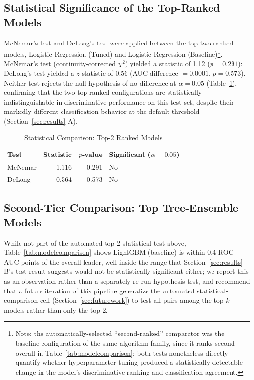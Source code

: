 \documentclass[journal]{IEEEtran}
\begin{document}
\subsection{Statistical Significance of the Top-Ranked Models}

McNemar's test and DeLong's test were applied between the top two ranked models, Logistic Regression (Tuned) and Logistic Regression (Baseline)\footnote{Note: the automatically-selected ``second-ranked'' comparator was the baseline configuration of the same algorithm family, since it ranks second overall in Table~\ref{tab:modelcomparison}; both tests nonetheless directly quantify whether hyperparameter tuning produced a statistically detectable change in the model's discriminative ranking and classification agreement.}. McNemar's test (continuity-corrected $\chi^2$) yielded a statistic of 1.12 ($p=0.291$); DeLong's test yielded a $z$-statistic of 0.56 (AUC difference $=0.0001$, $p=0.573$). Neither test rejects the null hypothesis of no difference at $\alpha=0.05$ (Table~\ref{tab:stattests}), confirming that the two top-ranked configurations are statistically indistinguishable in discriminative performance on this test set, despite their markedly different classification behavior at the default threshold (Section~\ref{sec:results}-A).

\begin{table}[!t]
\caption{Statistical Comparison: Top-2 Ranked Models}
\label{tab:stattests}
\centering
\begin{tabular}{lrrl}
\toprule
Test & Statistic & $p$-value & Significant ($\alpha=0.05$) \\
\midrule
McNemar & 1.116 & 0.291 & No \\
DeLong & 0.564 & 0.573 & No \\
\bottomrule
\end{tabular}
\end{table}

\subsection{Second-Tier Comparison: Top Tree-Ensemble Models}

While not part of the automated top-2 statistical test above, Table~\ref{tab:modelcomparison} shows LightGBM (baseline) is within 0.4 ROC-AUC points of the overall leader, well inside the range that Section~\ref{sec:results}-B's test result suggests would not be statistically significant either; we report this as an observation rather than a separately re-run hypothesis test, and recommend that a future iteration of this pipeline generalize the automated statistical-comparison cell (Section~\ref{sec:futurework}) to test all pairs among the top-$k$ models rather than only the top 2.
\end{document}
